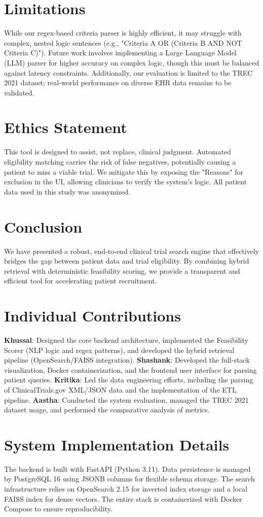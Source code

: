 \documentclass[11pt]{article}
\begin{document}
\section{Limitations}
While our regex-based criteria parser is highly efficient, it may struggle with complex, nested logic sentences (e.g., "Criteria A OR (Criteria B AND NOT Criteria C)"). Future work involves implementing a Large Language Model (LLM) parser for higher accuracy on complex logic, though this must be balanced against latency constraints. Additionally, our evaluation is limited to the TREC 2021 dataset; real-world performance on diverse EHR data remains to be validated.
\section{Ethics Statement}
This tool is designed to assist, not replace, clinical judgment. Automated eligibility matching carries the risk of false negatives, potentially causing a patient to miss a viable trial. We mitigate this by exposing the "Reasons" for exclusion in the UI, allowing clinicians to verify the system's logic. All patient data used in this study was anonymized.
\section{Conclusion}
We have presented a robust, end-to-end clinical trial search engine that effectively bridges the gap between patient data and trial eligibility. By combining hybrid retrieval with deterministic feasibility scoring, we provide a transparent and efficient tool for accelerating patient recruitment.

\section*{Individual Contributions}
\textbf{Khussal}: Designed the core backend architecture, implemented the Feasibility Scorer (NLP logic and regex patterns), and developed the hybrid retrieval pipeline (OpenSearch/FAISS integration).
\textbf{Shashank}: Developed the full-stack visualization, Docker containerization, and the frontend user interface for parsing patient queries.
\textbf{Kritika}: Led the data engineering efforts, including the parsing of ClinicalTrials.gov XML/JSON data and the implementation of the ETL pipeline.
\textbf{Aastha}: Conducted the system evaluation, managed the TREC 2021 dataset usage, and performed the comparative analysis of metrics.


\appendix
\section{System Implementation Details}
\label{sec:appendix}
The backend is built with FastAPI (Python 3.11). Data persistence is managed by PostgreSQL 16 using JSONB columns for flexible schema storage. The search infrastructure relies on OpenSearch 2.15 for inverted index storage and a local FAISS index for dense vectors. The entire stack is containerized with Docker Compose to ensure reproducibility.
\end{document}
